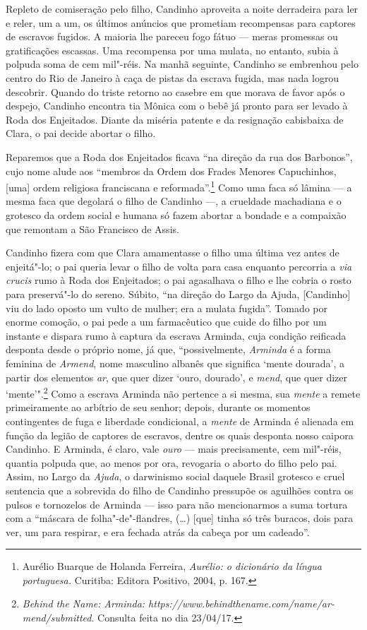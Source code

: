 Repleto de comiseração pelo filho, Candinho aproveita a noite derradeira
para ler e reler, um a um, os últimos anúncios que prometiam recompensas
para captores de escravos fugidos. A maioria lhe pareceu fogo fátuo ---
meras promessas ou gratificações escassas. Uma recompensa por uma
mulata, no entanto, subia à polpuda soma de cem mil"-réis. Na manhã
seguinte, Candinho se embrenhou pelo centro do Rio de Janeiro à caça de
pistas da escrava fugida, mas nada logrou descobrir. Quando do triste
retorno ao casebre em que morava de favor após o despejo, Candinho
encontra tia Mônica com o bebê já pronto para ser levado à Roda dos
Enjeitados. Diante da miséria patente e da resignação cabisbaixa de
Clara, o pai decide abortar o filho.

Reparemos que a Roda dos Enjeitados ficava ``na direção da rua dos
Barbonos'', cujo nome alude aos ``membros da Ordem dos Frades Menores
Capuchinhos, {[}uma{]} ordem religiosa franciscana e
reformada''.\footnote{Aurélio Buarque de Holanda Ferreira, \emph{Aurélio:
  o dicionário da língua portuguesa.} Curitiba: Editora Positivo, 2004,
  p. 167.} Como uma faca só lâmina --- a mesma faca que degolará o filho
de Candinho ---, a crueldade machadiana e o grotesco da ordem social e
humana só fazem abortar a bondade e a compaixão que remontam a São
Francisco de Assis.

Candinho fizera com que Clara amamentasse o filho uma última vez antes
de enjeitá"-lo; o pai queria levar o filho de volta para casa enquanto
percorria a \emph{via crucis} rumo à Roda dos Enjeitados; o pai
agasalhava o filho e lhe cobria o rosto para preservá"-lo do sereno.
Súbito, ``na direção do Largo da Ajuda, {[}Candinho{]} viu do lado
oposto um vulto de mulher; era a mulata fugida''. Tomado por enorme
comoção, o pai pede a um farmacêutico que cuide do filho por um instante
e dispara rumo à captura da escrava Arminda, cuja condição reificada
desponta desde o próprio nome, já que, ``possivelmente, \emph{Arminda} é
a forma feminina de \emph{Armend}, nome masculino albanês que significa
`mente dourada', a partir dos elementos \emph{ar}, que quer dizer `ouro,
dourado', e \emph{mend}, que quer dizer `mente'".\footnote{\emph{Behind
  the Name:} \emph{Arminda:
  https://www.behindthename.com/name/ar-
  mend/submitted}.
  Consulta feita no dia 23/04/17.} Como a escrava Arminda não pertence
a si mesma, sua \emph{mente} a remete primeiramente ao arbítrio de seu
senhor; depois, durante os momentos contingentes de fuga e liberdade
condicional, a \emph{mente} de Arminda é alienada em função da legião de
captores de escravos, dentre os quais desponta nosso caipora Candinho. E
Arminda, é claro, vale \emph{ouro} --- mais precisamente, cem mil"-réis,
quantia polpuda que, ao menos por ora, revogaria o aborto do filho pelo
pai. Assim, no Largo da \emph{Ajuda}, o darwinismo social daquele Brasil
grotesco e cruel sentencia que a sobrevida do filho de Candinho
pressupõe os aguilhões contra os pulsos e tornozelos de Arminda --- isso
para não mencionarmos a suma tortura com a ``máscara de
folha"-de"-flandres, (\ldots{}) [que] tinha só três buracos, dois para ver,
um para respirar, e era fechada atrás da cabeça por um cadeado''.

